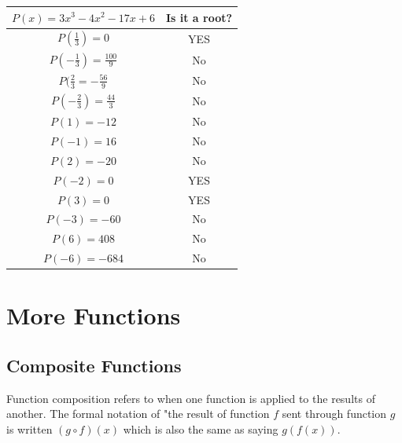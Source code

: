 \documentclass{article}
\begin{document}
    \begin{center}
        \begin{tabular}{|c|c|}
            \hline
            \textbf{$P(x)=3x^3-4x^2-17x+6$} & \textbf{Is it a root?} \\
            \hline
            $P(\frac{1}{3})=0$              & YES                    \\
            \hline
            $P(-\frac{1}{3})=\frac{100}{9}$ & No                     \\
            \hline
            $P(\frac{2}{3}=-\frac{56}{9}$   & No                     \\
            \hline
            $P(-\frac{2}{3})=\frac{44}{3}$  & No                     \\
            \hline
            $P(1)=-12$                      & No                     \\
            \hline
            $P(-1)=16$                      & No                     \\
            \hline
            $P(2)=-20$                      & No                     \\
            \hline
            $P(-2)=0$                       & YES                    \\
            \hline
            $P(3)=0$                        & YES                    \\
            \hline
            $P(-3)=-60$                     & No                     \\
            \hline
            $P(6)=408$                      & No                     \\
            \hline
            $P(-6)=-684$                    & No                     \\
            \hline
        \end{tabular}
    \end{center}



    \section{More Functions}

    \subsection{Composite Functions}
    Function composition refers to when one function is applied to the results of another.
    The formal notation of "the result of function $f$ sent through function $g$ is written
    $(g\circ f)(x)$ which is also the same as saying $g(f(x))$. \\
\end{document}
